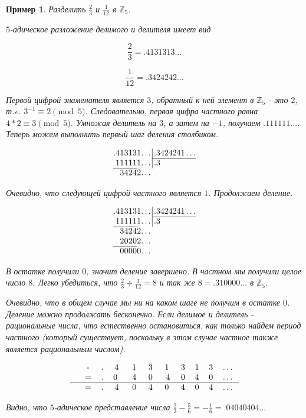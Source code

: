 \documentclass[master, och, diploma, times]{sty/SCWorks}
\theoremstyle{plain}
\newtheorem{exmp}{Пример}[section]
\theoremstyle{definition}
\begin{document}
\begin{exmp}
Разделить $\frac{2}{3}$ и $\frac{1}{12}$ в $\mathbb{Z}_5$.

\noindent $5$-адическое разложение делимого и делителя имеет вид

$$
\frac{2}{3}=.4131313\dots
$$

$$
\frac{1}{12}=.3424242\dots
$$

\noindent Первой цифрой знаменателя является $3$, обратный к ней элемент в $\mathbb{Z}_5$ - это $2$, т.e. $3^{-1} \equiv 2 \pmod 5$. Следовательно, первая цифра частного равна \mbox{$4*2 \equiv 3 \pmod 5$}. Умножая делитель на $3$, а затем на $-1$, получаем $.111111\dots$. Теперь можем выполнить первый шаг деления столбиком.

$$
\arraycolsep=0.01em
\begin{array}{rrrrrrrr@{\,}r|l}
.&4&1&3&1&3&1&\dots&&\,.3424241\dots\\
\cline{10-10}
&1&1&1&1&1&1&\dots&&\,.3\\
\cline{1-6}
&&3&4&2&4&2&\dots
\end{array}
$$

\noindent Очевидно, что следующей цифрой частного является $1$. Продолжаем деление.

$$
\arraycolsep=0.01em
\begin{array}{rrrrrrrr@{\,}r|l}
.&4&1&3&1&3&1&\dots&&\,.3424241\dots\\
\cline{10-10}
&1&1&1&1&1&1&\dots&&\,.3\\
\cline{1-6}
&&3&4&2&4&2&\dots \\
&&2&0&2&0&2&\dots \\
\cline{1-6}
&&0&0&0&0&0&\dots
\end{array}
$$

\noindent В остатке получили $0$, значит деление завершено. В частном мы получили целое число $8$. Легко убедиться, что $\frac{2}{3} \div \frac{1}{12}=8$ и так же $8=.310000\dots$ в $\mathbb{Z}_5$.

Очевидно, что в общем случае мы ни на каком шаге не получим в остатке $0$. Деление можно продолжать бесконечно. Если делимое и делитель - рациональные числа, что естественно остановиться, как только найдем период частного (который существует, поскольку в этом случае частное также является рациональным числом).

$$
\begin{tabular}{cccccccccccc}
& - & . & 4\; & 1\; & 3\; & 1\; & 3 & 1 & 3 & \dots \\
& = & . & 0 \; & 4\; & 0\; & 4 & 0 & 4 & 0 & \dots \\
\hline
& = & . & 4\; & 0\; & 4\; & 0\; & 4 & 0 & 4 & \dots
\end{tabular}
$$

\noindent Видно, что $5$-адическое представление числа $\frac{2}{3} - \frac{5}{6}=-\frac{1}{6}=.04040404\dots$
\end{exmp}
\end{document}
